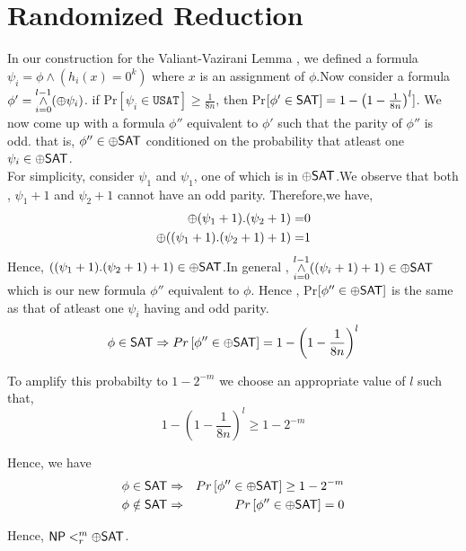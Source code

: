 \documentclass[11pt]{article}
\begin{document}
\section{Randomized Reduction}

	In our construction for the Valiant-Vazirani Lemma , we defined a formula $\psi_i = \phi \wedge (h_i(x)= 0^k)$
where $x$ is an assignment of $\phi$.Now consider a formula $\phi' = \overset{l-1}{\underset{i = 0} \wedge } (\oplus
\psi_i)$. if Pr$\left[\psi_i \in \texttt{USAT} \right] \geq \frac{1}{8n}$, then Pr$\left[ \phi' \in {\ensuremath{\mathsf{SAT}}}\right] = 1 -
\left(1 - \frac{1}{8n } \right)^l]$. We now come up with a formula $\phi''$ equivalent to $\phi'$ such that the parity
of $\phi''$  is odd. that is, $\phi'' \in \oplus {\ensuremath{\mathsf{SAT}}}$ conditioned on the probability that atleast one $\psi_i \in
\oplus {\ensuremath{\mathsf{SAT}}} $.\\
For simplicity, consider $\psi_1$ and $\psi_1$, one of which is in $\oplus {\ensuremath{\mathsf{SAT}}}$.We observe that both ,
$\psi_1 + 1$ and $\psi_2 + 1$ cannot have an odd parity. Therefore,we have, 
\begin{align*}
\oplus(\psi_1 + 1) .(\psi_2 + 1) =& 0\\
\oplus((\psi_1 + 1) .(\psi_2 + 1)+ 1) =& 1 
\end{align*}
Hence, $((\psi_1 + 1) .(\psi_2 + 1)+ 1) \in \oplus {\ensuremath{\mathsf{SAT}}}$.In general , 
$\overset{l-1}{ \underset{i = 0}\wedge} ((\psi_i + 1)+ 1) \in \oplus {\ensuremath{\mathsf{SAT}}}$ which is our new formula $\phi''$
equivalent to $\phi.$ Hence , Pr$\left[\phi'' \in \oplus {\ensuremath{\mathsf{SAT}}} \right]$ is the same as that of atleast one $\psi_i$
having and odd parity.
 \[\phi \in {\ensuremath{\mathsf{SAT}}} \Rightarrow Pr \left[\phi'' \in \oplus {\ensuremath{\mathsf{SAT}}} \right] =1 -\left(1 - \frac{1}{8n }\right)^l \]

To amplify this probabilty to $1 - 2^{-m} $ we choose an appropriate value of $l$ such that,
\[1 -\left(1 - \frac{1}{8n }\right)^l \geq 1 - 2^{-m} \]

Hence, we have 
\begin{eqnarray*}
 \phi \in {\ensuremath{\mathsf{SAT}}} & \Rightarrow &  Pr\left[\phi'' \in \oplus {\ensuremath{\mathsf{SAT}}} \right]\geq  1 - 2^{-m} \\
 \phi \notin {\ensuremath{\mathsf{SAT}}} & \Rightarrow & Pr\left[\phi'' \in \oplus {\ensuremath{\mathsf{SAT}}} \right] = 0 
\end{eqnarray*}

Hence, ${\mathsf{NP}} <^m_r \oplus {\ensuremath{\mathsf{SAT}}}$.
 
\end{document}
